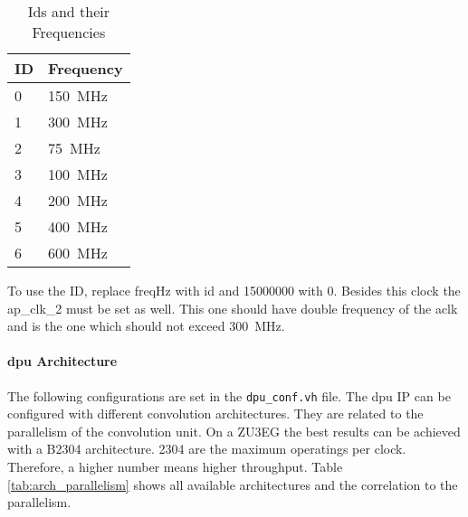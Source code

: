 \begin{table}[hb]
  \caption{Ids and their Frequencies}
  \label{tab:frequencies_ids}
  \centering
  \begin{tabular}{ll}
    \toprule
    \textbf{ID} & \textbf{Frequency} \\
    \midrule
    0 & \SI{150}{MHz} \\
    1 & \SI{300}{MHz} \\
    2 & \SI{75}{MHz} \\
    3 & \SI{100}{MHz} \\
    4 & \SI{200}{MHz} \\
    5 & \SI{400}{MHz} \\
    6 & \SI{600}{MHz} \\
    \bottomrule
  \end{tabular}
\end{table}

To use the ID, replace freqHz with id and 15000000 with 0.
Besides this clock the ap\_clk\_2 must be set as well.
This one should have double frequency of the aclk and is the one which should not exceed \SI{300}{MHz}.

\paragraph{\acrshort{dpu} Architecture}
The following configurations are set in the \texttt{dpu\_conf.vh} file.
The \acrshort{dpu} IP can be configured with different convolution architectures.
They are related to the parallelism of the convolution unit.
On a ZU3EG the best results can be achieved with a B2304 architecture.
2304 are the maximum operatings per clock.
Therefore, a higher number means higher throughput.
Table \ref{tab:arch_parallelism} shows all available architectures and the correlation to the parallelism.

